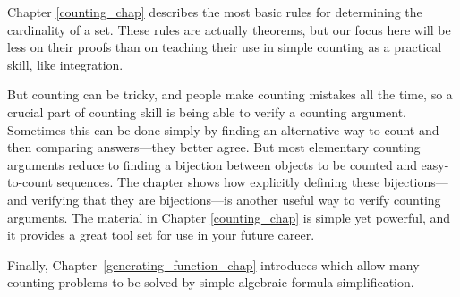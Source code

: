 \iffalse
In Chapter~\ref{chap:recurrences}, we show how to solve a variety of
recurrences that arise in computational problems.  These methods are
especially useful when you need to design or analyze recursive
programs.
\fi

Chapter \ref{counting_chap} describes the most basic rules for determining
the cardinality of a set.  These rules are actually theorems, but our
focus here will be less on their proofs than on teaching their use in
simple counting as a practical skill, like integration.

But counting can be tricky, and people make counting mistakes all the
time, so a crucial part of counting skill is being able to verify a
counting argument.  Sometimes this can be done simply by finding an
alternative way to count and then comparing answers---they better
agree.  But most elementary counting arguments reduce to finding a
bijection between objects to be counted and easy-to-count sequences.
The chapter shows how explicitly defining these bijections---and
verifying that they are bijections---is another useful way to verify
counting arguments.  The material in Chapter \ref{counting_chap} is
simple yet powerful, and it provides a great tool set for use in your
future career.

Finally, Chapter~\ref{generating_function_chap} introduces
 which allow many counting problems to be
solved by simple algebraic formula simplification.

\iffalse
We conclude in Chapter~\ref{cardinality_chap} with a brief digression
into the final frontier of counting---infinity.  We'll define what it
means for a set to be countable and show you some examples of sets
that are really big---bigger even than the set of real numbers.
\fi

\endinput
